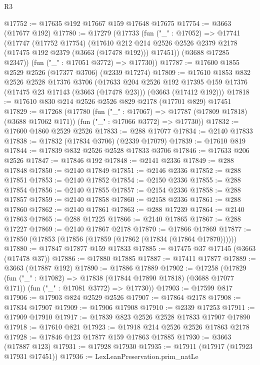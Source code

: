 \begin{lexlean}{R3}
\begin{coremodule}
@17752 := @17635 @192 @17667 @159 @17648 @17675
@17754 := @3663 (@17677 @192)
@17780 := @17279
    (@17733
      (fun ("_" : @17052) =>
      @17741
        (@17747
          (@17752 @17754)
          (@17610
            @212
            @214
            @2526
            @2526
            @2379
            @2178
            (@17475 @192 @2379 (@3663 (@17478 @192)))
            @17451))
        (@3688 @17285 @2347))
      (fun ("_" : @17051 @3772) => @17730))
@17787 := @17600 @1855 @2529 @2526 (@17377 @3706) (@2339 @17274)
@17809 := @17610
    @1853
    @832
    @2526
    @2528
    @17376
    @3706
    (@17633
      @204
      @2526
      @192
      @17395
      @159
      @17376
      (@17475 @23 @17143 (@3663 (@17478 @23)))
      (@3663 (@17412 @192)))
@17818 := @17610 @830 @214 @2526 @2526 @829 @2178 (@17701 @829) @17451
@17829 := @17268
    (@17780
      (fun ("_" : @17067) => @17787 (@17809 @17818) (@3688 @17062 @171))
      (fun ("_" : @17066 @3772) => @17730))
@17832 := @17600 @1860 @2529 @2526
@17833 := @288 @17077
@17834 := @2140 @17833
@17838 := @17832 (@17834 @3706) (@2339 @17079)
@17839 := @17610 @819
@17844 := @17839 @832 @2526 @2528 @17833 @3706
@17846 := @17633 @206 @2526
@17847 := @17846 @192
@17848 := @2141 @2336
@17849 := @288 @17848
@17850 := @2140 @17849
@17851 := @2146 @2336
@17852 := @288 @17851
@17853 := @2140 @17852
@17854 := @2150 @2336
@17855 := @288 @17854
@17856 := @2140 @17855
@17857 := @2154 @2336
@17858 := @288 @17857
@17859 := @2140 @17858
@17860 := @2158 @2336
@17861 := @288 @17860
@17862 := @2140 @17861
@17863 := @288 @17239
@17864 := @2140 @17863
@17865 := @288 @17225
@17866 := @2140 @17865
@17867 := @288 @17227
@17869 := @2140 @17867 @2178
@17870 := @17866 @17869
@17877 := @17850 (@17853 (@17856 (@17859 (@17862 (@17834 (@17864 @17870))))))
@17880 := @17847 @17877 @159 @17833
@17885 := @17475 @37 @17145 (@3663 (@17478 @37))
@17886 := @17880 @17885
@17887 := @17411 @17877
@17889 := @3663 (@17887 @192)
@17890 := @17886 @17889
@17902 := @17258
    (@17829
      (fun ("_" : @17082) => @17838 (@17844 @17890 @17818) (@3688 @17077 @171))
      (fun ("_" : @17081 @3772) => @17730))
@17903 := @17599 @817
@17906 := @17903 @824 @2529 @2526
@17907 := @17864 @2178
@17908 := @17834 @17907
@17909 := @17906 @17908
@17910 := @2339 @17253
@17911 := @17909 @17910
@17917 := @17839 @823 @2526 @2528 @17833 @17907 @17890
@17918 := @17610 @821
@17923 := @17918 @214 @2526 @2526 @17863 @2178
@17928 := @17846 @123 @17877 @159 @17863 @17885
@17930 := @3663 (@17887 @123)
@17931 := @17928 @17930
@17935 := @17911 (@17917 (@17923 @17931 @17451))
@17936 := LexLeanPreservation.prim_natLe

\end{coremodule}
\end{lexlean}
